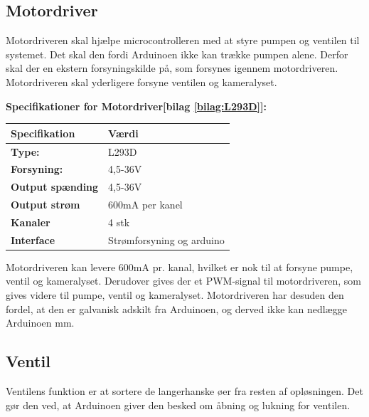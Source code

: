 \subsection{Motordriver}
Motordriveren skal hjælpe microcontrolleren med at styre pumpen og ventilen til systemet. Det skal den fordi Arduinoen ikke kan trække pumpen alene. Derfor skal der en ekstern forsyningskilde på, som forsynes igennem motordriveren. Motordriveren skal yderligere forsyne ventilen og kameralyset. 

 \textbf{Specifikationer for Motordriver[bilag \ref{bilag:L293D}]:} 
\begin{center}
		\begin{longtable}{ | m{6.5cm} | m{6.5cm}| } 
			\hline
			\textbf{Specifikation} &\textbf{Værdi} \\ 
			\hline
			\textbf{Type:} & L293D \\ 
			\hline
			\textbf{Forsyning:} &  4,5-36V \\ 
			\hline
			\textbf{Output spænding} & 4,5-36V  \\ 
			\hline		
			\textbf{Output strøm} & 600mA per kanel  \\ 
			\hline	
			\textbf{Kanaler} & 4 stk  \\ 
			\hline	
			\textbf{Interface} & Strømforsyning og arduino  \\ 
			\hline	
		\end{longtable}
\end{center}
Motordriveren kan levere 600mA pr. kanal, hvilket er nok til at forsyne pumpe, ventil og kameralyset. Derudover gives der et PWM-signal til motordriveren, som gives videre til pumpe, ventil og kameralyset. Motordriveren har desuden den fordel, at den er galvanisk adskilt fra Arduinoen, og derved ikke kan nedlægge Arduinoen mm.


\subsection{Ventil} \label{design_ventil}
Ventilens funktion er at sortere de langerhanske øer fra resten af opløsningen. Det gør den ved, at Arduinoen giver den besked om åbning og lukning for ventilen.

